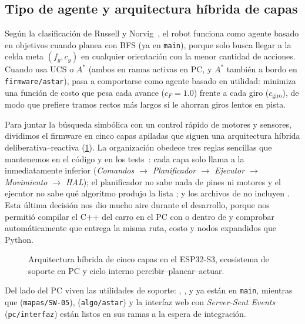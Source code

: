\subsection{Tipo de agente y arquitectura híbrida de capas}
\label{subsec:tipo-arquitectura}

Según la clasificación de Russell y Norvig~\cite{russell2021aima}, el robot funciona como agente basado en objetivos cuando planea con BFS (ya en \texttt{main}), porque solo busca llegar a la celda meta $(f_g, c_g)$ en cualquier orientación con la menor cantidad de acciones. Cuando usa UCS o $A^*$ (ambos en ramas activas en PC, y $A^*$ también a bordo en \texttt{firmware/astar}), pasa a comportarse como agente basado en utilidad: minimiza una función de costo que pesa cada avance ($c_F = 1.0$) frente a cada giro ($c_{\text{giro}}$), de modo que prefiere tramos rectos más largos si le ahorran giros lentos en pista.

Para juntar la búsqueda simbólica con un control rápido de motores y sensores, dividimos el firmware en cinco capas apiladas que siguen una arquitectura híbrida deliberativa--reactiva (\cref{fig:arquitectura-capas}). La organización obedece tres reglas sencillas que mantenemos en el código y en los tests~\cite{arquitectura2026doc}: cada capa solo llama a la inmediatamente inferior (\textit{Comandos $\rightarrow$ Planificador $\rightarrow$ Ejecutor $\rightarrow$ Movimiento $\rightarrow$ HAL}); el planificador no sabe nada de pines ni motores y el ejecutor no sabe qué algoritmo produjo la lista ; y los archivos de  no incluyen . Esta última decisión nos dio mucho aire durante el desarrollo, porque nos permitió compilar el C++ del carro en el PC con  o  dentro de  y comprobar automáticamente que entrega la misma ruta, costo y nodos expandidos que Python.

\begin{figure}[H]
\centering

\caption{Arquitectura híbrida de cinco capas en el ESP32-S3, ecosistema de soporte en PC y ciclo interno percibir--planear--actuar.}
\label{fig:arquitectura-capas}
\end{figure}

Del lado del PC viven las utilidades de soporte: , ,  y  ya están en \texttt{main}, mientras que  (\texttt{mapas/SW-05}),  (\texttt{algo/astar}) y la interfaz web con \textit{Server-Sent Events}  (\texttt{pc/interfaz}) están listos en sus ramas a la espera de integración.
